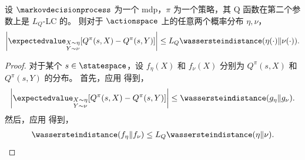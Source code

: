 \begin{prop}
\label{pp:expected_q_bound}
    设 $\markovdecisionprocess$ 为一个 \gls{mdp}，$\pi$ 为一个策略，其 Q 函数在第二个参数上是 $L_{Q}$-LC 的。
    则对于 $\actionspace$ 上的任意两个概率分布 $\eta,\nu$，
    \begin{align*}
        \left\vert \expectedvalue_{\substack{X\sim \eta\\Y\sim \nu}}[Q^{\pi}(s,X)-Q^{\pi}(s,Y)] \right\vert
        \leq L_{Q} \wassersteindistance(\eta(\cdot)\Vert\nu(\cdot)).
    \end{align*}
\end{prop}
\begin{proof}
    对于某个 $s\in\statespace$，设 $f_{\eta}(X)$ 和 $f_{\nu}(X)$ 分别为 $Q^{\pi}(s,X)$ 和 $Q^{\pi}(s,Y)$ 的分布。
    首先，应用  得到，
    \begin{align*}
        \left\vert \expectedvalue_{\substack{X\sim \eta\\Y\sim \nu}}[Q^{\pi}(s,X)-Q^{\pi}(s,Y)] \right\vert
        \leq  \wassersteindistance(g_{\eta}\Vert g_{\nu}).
    \end{align*}
    然后，应用  得到，
    \begin{align*}
        \wassersteindistance(f_{\eta}\Vert f_{\nu})
        \leq L_{Q} \wassersteindistance(\eta\Vert \nu).
    \end{align*}
\end{proof}


